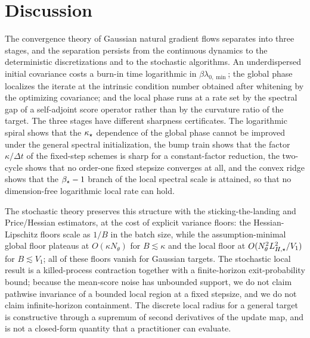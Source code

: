 \section{Discussion}
\label{sec:discussion}

The convergence theory of Gaussian natural gradient flows separates into three
stages, and the separation persists from the continuous dynamics to the
deterministic discretizations and to the stochastic algorithms. An underdispersed
initial covariance costs a burn-in time logarithmic in
$\beta \lambda_{0,\min}$; the global phase localizes the iterate at the intrinsic
condition number obtained after whitening by the optimizing covariance; and the
local phase runs at a rate set by the spectral gap of a self-adjoint score
operator rather than by the curvature ratio of the target. The three stages have
different sharpness certificates. The logarithmic spiral shows that the
$\kappa_\star$ dependence of the global phase cannot be improved under the general
spectral initialization, the bump train shows that the factor $\kappa/\Delta t$
of the fixed-step schemes is sharp for a constant-factor reduction, the
two-cycle shows that no order-one fixed stepsize converges at all, and the
convex ridge shows that the $\beta_\star-1$ branch of the local spectral scale is
attained, so that no dimension-free logarithmic local rate can hold.

The stochastic theory preserves this structure with the sticking-the-landing and
Price/Hessian estimators, at the cost of explicit variance floors: the
Hessian-Lipschitz floors scale as $1/B$ in the batch size, while the
assumption-minimal global floor plateaus at $O(\kappa N_\theta)$ for
$B\lesssim\kappa$ and the local floor at $O(N_\theta^2L_{H,\star}^2/V_1)$ for
$B\lesssim V_1$; all of these floors vanish for Gaussian targets. The stochastic local result is a killed-process contraction together with a
finite-horizon exit-probability bound; because the mean-score noise has
unbounded support, we do not claim pathwise invariance of a bounded local region
at a fixed stepsize, and we do not claim infinite-horizon containment. The
discrete local radius for a general target is constructive through a supremum of
second derivatives of the update map, and is not a closed-form quantity that a
practitioner can evaluate.

